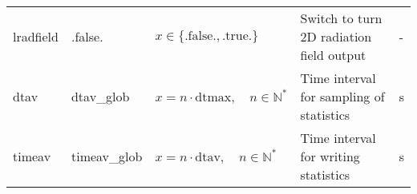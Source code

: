 \documentclass[twoside,11pt,fleqn,a4paper,english,openright]{report}
\begin{document}
\begin{center}
  \tablelasttail{
        &&&&\\\hline
  }
\begin{supertabular}{|l|p{2cm}|p{4cm}|p{6cm}|l|}
  lradfield	& .false.	& $x\in\{\text{.false.},\text{.true.}\}$	        & Switch to turn 2D radiation field output & -\\
  dtav		& dtav\_glob	& $x = n \cdot \text{dtmax}, \quad n \in \mathbb{N}^*$	& Time interval for sampling of statistics	& s\\
  timeav	& timeav\_glob	& $x = n \cdot \text{dtav},  \quad n \in \mathbb{N}^*$	& Time interval for writing statistics		& s\\
\end{supertabular}
\end{center}

\newpage
\end{document}
